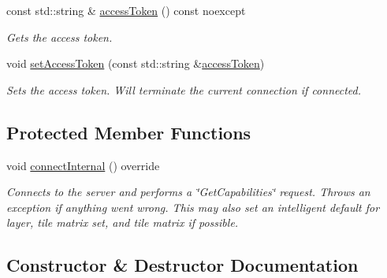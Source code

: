 \begin{DoxyCompactItemize}
const std\+::string \& \hyperlink{group___imagery_module_ga09b8428dd2d706d2816a06509cdefdf3}{access\+Token} () const noexcept
\begin{DoxyCompactList}\small\item\em Gets the access token. \end{DoxyCompactList}\item 
void \hyperlink{group___imagery_module_ga24970dc0f6164b6592cb6a97bab71e15}{set\+Access\+Token} (const std\+::string \&\hyperlink{group___imagery_module_ga09b8428dd2d706d2816a06509cdefdf3}{access\+Token})
\begin{DoxyCompactList}\small\item\em Sets the access token. Will terminate the current connection if connected. \end{DoxyCompactList}\end{DoxyCompactItemize}
\subsection*{Protected Member Functions}
\begin{DoxyCompactItemize}
\item 
void \hyperlink{classdg_1_1deepcore_1_1imagery_1_1_map_box_client_aa46bb7e4f7f6b83810c2e80cef034fe8}{connect\+Internal} () override
\begin{DoxyCompactList}\small\item\em Connects to the server and performs a \char`\"{}\+Get\+Capabilities\char`\"{} request. Throws an exception if anything went wrong. This may also set an intelligent default for layer, tile matrix set, and tile matrix if possible. \end{DoxyCompactList}\end{DoxyCompactItemize}


\subsection{Constructor \& Destructor Documentation}
